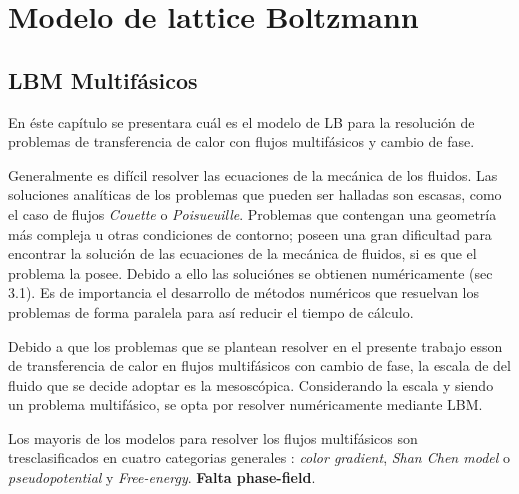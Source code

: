 \chapter{Modelo de lattice Boltzmann}
\graphicspath{{figs/cap2/}}
\label{cap2}

\section{LBM Multifásicos}

En éste capítulo se presentara cuál es el modelo de LB para la resolución de problemas de transferencia de calor con flujos multifásicos y cambio de fase.

Generalmente es difícil resolver las ecuaciones de la mecánica de los fluidos. Las soluciones analíticas de los problemas que pueden ser halladas son escasas, como el caso de flujos \textit{Couette} o \textit{Poisueuille}. Problemas que contengan una geometría más compleja u otras condiciones de contorno; poseen una gran dificultad para encontrar la solución de las ecuaciones de la mecánica de fluidos, si es que el problema la posee. Debido a ello las soluciónes se obtienen numéricamente \cite{kruger2017lattice}(sec 3.1). Es de importancia el desarrollo de métodos numéricos que resuelvan los problemas de forma paralela para así reducir el tiempo de cálculo.

Debido a que los problemas que se plantean resolver en el presente trabajo esson de transferencia de calor en flujos multifásicos con cambio de fase, la escala de del fluido que se decide adoptar es la mesoscópica. Considerando la escala y siendo un problema multifásico, se opta por resolver numéricamente mediante LBM. 


Los mayoris de los modelos para resolver los flujos multifásicos son tresclasificados en cuatro categorias generales : \textit{color gradient}, \textit{Shan Chen model} o \textit{pseudopotential} y \textit{Free-energy}. \textbf{Falta phase-field}. 

